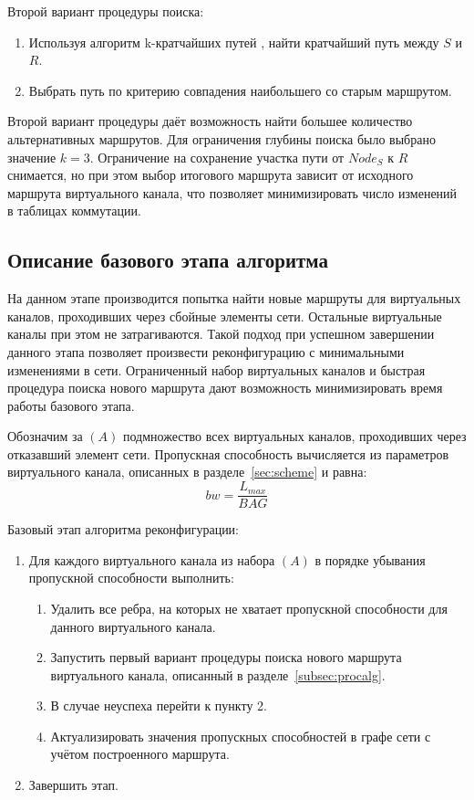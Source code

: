 \documentclass[12pt, a4paper]{article}
\begin{document}
Второй вариант процедуры поиска:
\begin{enumerate}
	\item Используя алгоритм k-кратчайших путей \cite{kshort}, найти кратчайший путь между $S$ и $R$.
	\item Выбрать путь по критерию совпадения наибольшего со старым маршрутом.
\end{enumerate}

Второй вариант процедуры даёт возможность найти большее количество альтернативных маршрутов. Для ограничения глубины поиска было выбрано значение $k = 3$. Ограничение на сохранение участка пути от $Node_{S}$ к $R$ снимается, но при этом выбор итогового маршрута зависит от исходного маршрута виртуального канала, что позволяет минимизировать число изменений в таблицах коммутации.

\subsection{Описание базового этапа алгоритма}

На данном этапе производится попытка найти новые маршруты для виртуальных каналов, проходивших через сбойные элементы сети. Остальные виртуальные каналы при этом не затрагиваются. Такой подход при успешном завершении данного этапа позволяет произвести реконфигурацию с минимальными изменениями в сети. Ограниченный набор виртуальных каналов и быстрая процедура поиска нового маршрута дают возможность минимизировать время работы базового этапа.

Обозначим за $(A)$ подмножество всех виртуальных каналов, проходивших через отказавший элемент сети. Пропускная способность вычисляется
из параметров виртуального канала, описанных в разделе~\ref{sec:scheme} и равна:
$$bw = \frac{L_{max}}{BAG}$$

Базовый этап алгоритма реконфигурации:
\begin{enumerate}
	\item Для каждого виртуального канала из набора $(A)$ в порядке убывания пропускной способности выполнить:
	\begin{enumerate}
	\item Удалить все ребра, на которых не хватает пропускной способности для данного виртуального канала.
	\item Запустить первый вариант процедуры поиска нового маршрута виртуального канала, описанный в разделе~\ref{subsec:procalg}.
	\item В случае неуспеха перейти к пункту 2.
	\item Актуализировать значения пропускных способностей в графе сети с учётом построенного маршрута.
	\end{enumerate}
	\item Завершить этап.
\end{enumerate}
\end{document}
